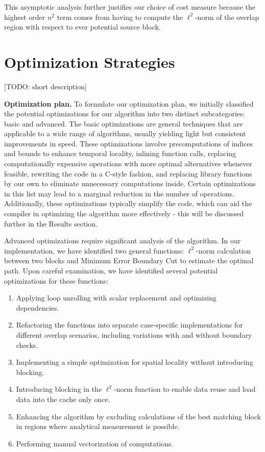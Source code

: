 \documentclass[letterpaper]{article}
\newcommand{\mypar}[1]{{\bf #1.}}
\begin{document}
This asymptotic analysis further justifies our choice of cost measure because the highest order $n^2$ term comes from having to compute the $\ell ^2$-norm of the overlap region with respect to ever potential source block.

\section{Optimization Strategies}\label{sec:yourmethod}

[TODO: short description]


\mypar{Optimization plan} 
To formulate our optimization plan, we initially classified the potential optimizations for our algorithm into two distinct subcategories: basic and advanced. The basic optimizations are general techniques that are applicable to a wide range of algorithms, usually yielding light but consistent improvements in speed. These optimizations involve precomputations of indices and bounds to enhance temporal locality, inlining function calls, replacing computationally expensive operations with more optimal alternatives whenever feasible, rewriting the code in a C-style fashion, and replacing library functions by our own to eliminate unnecessary computations inside. Certain optimizations in this list may lead to a marginal reduction in the number of operations. Additionally, these optimizations typically simplify the code, which can aid the compiler in optimizing the algorithm more effectively - this will be discussed further in the Results section.

Advanced optimizations require significant analysis of the algorithm. In our implementation, we have identified two general functions: $\ell ^2$-norm calculation between two blocks and Minimum Error Boundary Cut to estimate the optimal path. Upon careful examination, we have identified several potential optimizations for these functions:

\begin{enumerate}
\item Applying loop unrolling with scalar replacement and optimizing dependencies.
\item Refactoring the functions into separate case-specific implementations for different overlap scenarios, including variations with and without boundary checks.
\item Implementing a simple optimization for spatial locality without introducing blocking.
\item Introducing blocking in the $\ell ^2$-norm function to enable data reuse and load data into the cache only once.
\item Enhancing the algorithm by excluding calculations of the best matching block in regions where analytical measurement is possible.
\item Performing manual vectorization of computations.
\end{enumerate}
\end{document}
